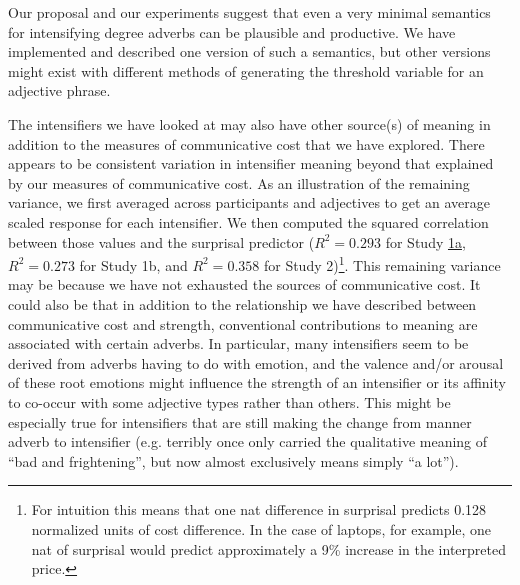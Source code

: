 \documentclass[10pt,letterpaper]{article}
\newcommand{\todo}[1]{{\color{red}#1}}
\newcommand{\ndg}[1]{{\color{green}#1}}
\begin{document}
Our proposal and our experiments suggest that even a very minimal semantics for intensifying degree adverbs can be plausible and productive.
We have implemented and described one version of such a semantics, but other versions might exist with different methods of generating the threshold variable for an adjective phrase.

The intensifiers we have looked at may also have other source(s) of meaning in addition to the measures of communicative cost that we have explored.
There appears to be consistent variation in intensifier meaning beyond that explained by our measures of communicative cost.
As an illustration of the remaining variance, we first averaged across participants and adjectives to get an average scaled response for each intensifier.
We then computed the squared correlation between those values and the surprisal predictor ($R^2=0.293$ for Study \hyperref[sec:study1a]{1a}, $R^2=0.273$ for Study 1b, and $R^2=0.358$ for Study 2)\footnote{
For intuition this means that one nat difference in surprisal predicts 0.128 normalized units of cost difference. In the case of laptops, for example, one nat of surprisal would predict approximately a 9\% increase in the interpreted price.
}.
This remaining variance may be because we have not exhausted the sources of communicative cost.
It could also be that in addition to the relationship we have described between communicative cost and strength, conventional contributions to meaning are associated with certain adverbs.
In particular, many intensifiers seem to be derived from adverbs having to do with emotion, and the valence and/or arousal of these root emotions might influence the strength of an intensifier or its affinity to co-occur with some adjective types rather than others.
This might be especially true for intensifiers that are still making the change from manner adverb to intensifier (e.g. terribly once only carried the qualitative meaning of ``bad and frightening'', but now almost exclusively means simply ``a lot'').

\end{document}
